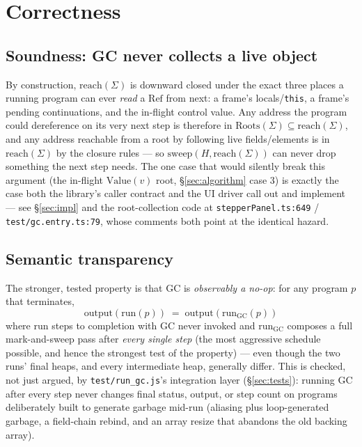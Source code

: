 \documentclass[11pt]{article}
\newcommand{\reach}{\mathrm{reach}}
\begin{document}
\section{Correctness}
\label{sec:correctness}

\subsection{Soundness: GC never collects a live object}

By construction, $\reach(\Sigma)$ is downward closed under the exact three
places a running program can ever \emph{read} a $\mathrm{Ref}$ from next: a
frame's locals/\texttt{this}, a frame's pending continuations, and the
in-flight control value. Any address the program could dereference on its
very next step is therefore in $\mathrm{Roots}(\Sigma) \subseteq
\reach(\Sigma)$, and any address reachable from a root by following live
fields/elements is in $\reach(\Sigma)$ by the closure rules --- so
$\mathrm{sweep}(H, \reach(\Sigma))$ can never drop something the next step
needs. The one case that would silently break this argument (the in-flight
$\mathrm{Value}(v)$ root, \S\ref{sec:algorithm} case 3) is exactly the case
both the library's caller contract and the UI driver call out and implement
--- see \S\ref{sec:impl} and the root-collection code at
\texttt{stepperPanel.ts:649} / \texttt{test/gc.entry.ts:79}, whose comments
both point at the identical hazard.

\subsection{Semantic transparency}

The stronger, tested property is that GC is \emph{observably a no-op}: for
any program $p$ that terminates,
\[
  \mathrm{output}(\mathrm{run}(p)) \;=\; \mathrm{output}(\mathrm{run}_{\mathrm{GC}}(p))
\]
where $\mathrm{run}$ steps to completion with GC never invoked and
$\mathrm{run}_{\mathrm{GC}}$ composes a full mark-and-sweep pass after
\emph{every single step} (the most aggressive schedule possible, and hence
the strongest test of the property) --- even though the two runs' final
heaps, and every intermediate heap, generally differ. This is checked, not
just argued, by \texttt{test/run\_gc.js}'s integration layer
(\S\ref{sec:tests}): running GC after every step never changes final
status, output, or step count on programs deliberately built to generate
garbage mid-run (aliasing plus loop-generated garbage, a field-chain
rebind, and an array resize that abandons the old backing array).
\end{document}
